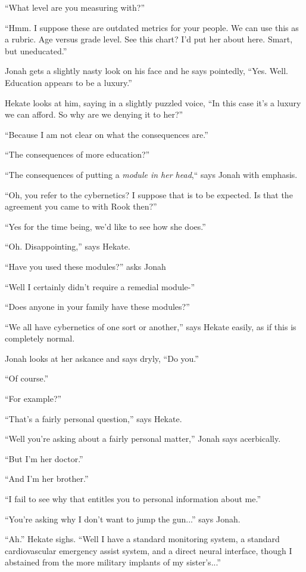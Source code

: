 ``What level are you measuring with?''

``Hmm. I suppose these are outdated metrics for your people.  We can use this as a rubric.  Age versus grade level.  See this chart?  I'd put her about here.  Smart, but uneducated.''

Jonah gets a slightly nasty look on his face and he says pointedly, ``Yes.  Well.  Education appears to be a luxury.''

Hekate looks at him, saying in a slightly puzzled voice, ``In this case it's a luxury we can afford.  So why are we denying it to her?''

``Because I am not clear on what the consequences are.''

``The consequences of more education?''

``The consequences of putting a \textit{module in her head},`` says Jonah with emphasis.

``Oh, you refer to the cybernetics?  I suppose that is to be expected.  Is that the agreement you came to with Rook then?''

``Yes for the time being, we'd like to see how she does.''

``Oh.  Disappointing,'' says Hekate.

``Have you used these modules?'' asks Jonah

``Well I certainly didn't require a remedial module-''

``Does anyone in your family have these modules?''

``We all have cybernetics of one sort or another,'' says Hekate easily, as if this is completely normal. 

Jonah looks at her askance and says dryly, ``Do you.''

``Of course.''

``For example?''

``That's a fairly personal question,'' says Hekate.

``Well you're asking about a fairly personal matter,'' Jonah says acerbically.

``But I'm her doctor.''

``And I'm her brother.''

``I fail to see why that entitles you to personal information about me.''

``You're asking why I don't want to jump the gun...'' says Jonah.

``Ah.''  Hekate sighs.  ``Well I have a standard monitoring system, a standard cardiovascular emergency assist system, and a direct neural interface, though I abstained from the more military implants of my sister's...''

